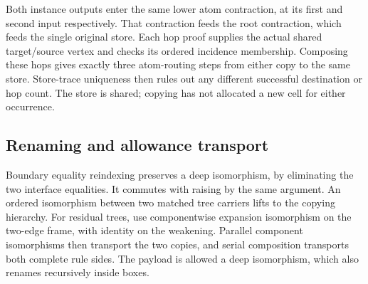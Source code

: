 



Both instance outputs enter the same lower atom contraction, at its first
and second input respectively. That contraction feeds the root contraction,
which feeds the single original store. Each hop proof supplies the actual
shared target/source vertex and checks its ordered incidence membership.
Composing these hops gives exactly three atom-routing steps from either
copy to the same store. Store-trace uniqueness then rules out any different
successful destination or hop count. The store is shared; copying has not
allocated a new cell for either occurrence.







\subsection{Renaming and allowance transport}

Boundary equality reindexing preserves a deep isomorphism, by eliminating
the two interface equalities. It commutes with raising by the same argument.
An ordered isomorphism between two matched tree carriers lifts to the
copying hierarchy. For residual trees, use componentwise expansion
isomorphism on the two-edge frame, with identity on the weakening.
Parallel component isomorphisms then transport the two copies, and serial
composition transports both complete rule sides. The payload is allowed a
deep isomorphism, which also renames recursively inside boxes.



